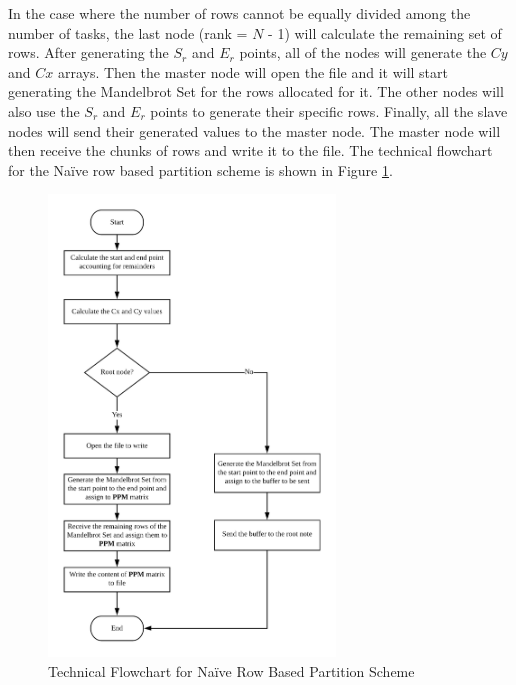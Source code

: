\documentclass[conference]{IEEEtran}
\begin{document}
			In the case where the number of rows cannot be equally divided among the number of tasks, the last node (rank = $N$ - 1) will calculate the remaining set of rows. \newline
			After generating the $S_r$ and $E_r$ points,  all of the nodes will generate the $Cy$ and $Cx$ arrays. Then the master node will open the file and it will start generating the Mandelbrot Set for the rows allocated for it. The other nodes will also use the $S_r$ and $E_r$ points to generate their specific rows. Finally, all the slave nodes will send their generated values to the master node. The master node will then receive the chunks of rows and write it to the file. The technical flowchart for the Naïve row based partition scheme is shown in Figure \ref{Naive_1}.
			
			\begin{figure}[h]
			\centering
			\includegraphics[width=3in]{Naive}
			\caption{Technical Flowchart for Naïve Row Based Partition Scheme}
			\label{Naive_1}
			\end{figure}
			
			
\end{document}
